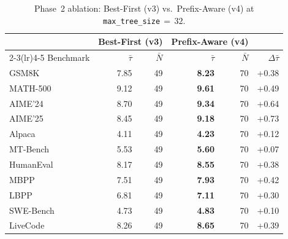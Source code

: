 \begin{table}[t]
\centering\small
\caption{Phase~2 ablation: Best-First (v3) vs.\ Prefix-Aware (v4) at \texttt{max\_tree\_size}$\,{=}\,32$.}
\label{tab:ablation-v3v4}
\begin{tabular}{@{}l rr rr r@{}}
\toprule
& \multicolumn{2}{c}{Best-First (v3)} & \multicolumn{2}{c}{Prefix-Aware (v4)} & \\
\cmidrule(lr){2-3}\cmidrule(lr){4-5}
Benchmark & $\bar{\tau}$ & $\bar{N}$ & $\bar{\tau}$ & $\bar{N}$ & $\Delta\bar{\tau}$ \\
\midrule
GSM8K & 7.85 & 49 & \textbf{8.23} & 70 & +0.38 \\
MATH-500 & 9.12 & 49 & \textbf{9.61} & 70 & +0.49 \\
AIME'24 & 8.70 & 49 & \textbf{9.34} & 70 & +0.64 \\
AIME'25 & 8.45 & 49 & \textbf{9.18} & 70 & +0.73 \\
Alpaca & 4.11 & 49 & \textbf{4.23} & 70 & +0.12 \\
MT-Bench & 5.53 & 49 & \textbf{5.60} & 70 & +0.07 \\
HumanEval & 8.17 & 49 & \textbf{8.55} & 70 & +0.38 \\
MBPP & 7.51 & 49 & \textbf{7.93} & 70 & +0.42 \\
LBPP & 6.81 & 49 & \textbf{7.11} & 70 & +0.30 \\
SWE-Bench & 4.73 & 49 & \textbf{4.83} & 70 & +0.10 \\
LiveCode & 8.26 & 49 & \textbf{8.65} & 70 & +0.39 \\
\bottomrule
\end{tabular}
\end{table}
